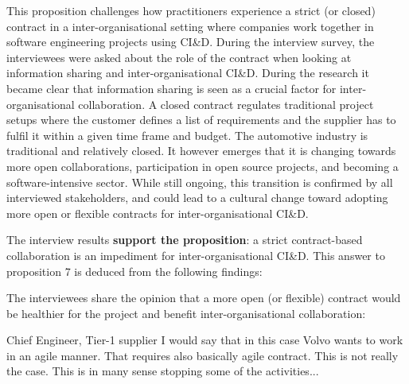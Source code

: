 This proposition challenges how practitioners experience a strict (or closed) contract in a inter-organisational setting where companies work together in software engineering projects using CI\&D. During the interview survey, the interviewees were asked about the role of the contract when looking at information sharing and inter-organisational CI\&D. During the research it became clear that information sharing is seen as a crucial factor for inter-organisational collaboration. A closed contract regulates traditional project setups where the customer defines a list of requirements and the supplier has to fulfil it within a given time frame and budget. The automotive industry is traditional and relatively closed. It however emerges that it is changing towards more open collaborations, %
participation in open source projects, and becoming a software-intensive sector. While still ongoing, this transition is confirmed by all interviewed stakeholders, and could lead to a cultural change toward adopting more open or flexible contracts for inter-organisational CI\&D.

The interview results {\bf support the proposition}: a strict contract-based collaboration is an impediment for inter-organisational CI\&D. This answer to proposition 7 is deduced from the following findings:


 The interviewees share the opinion that a more open (or flexible) contract would be healthier for the project and benefit inter-organisational collaboration: 

\begin{aquote}{Chief Engineer, Tier-1 supplier}
I would say that in this case Volvo wants to work in an agile manner. That requires also basically agile contract. This is not really the case. This is in many sense stopping some of the activities...
\end{aquote}
%
%
%


